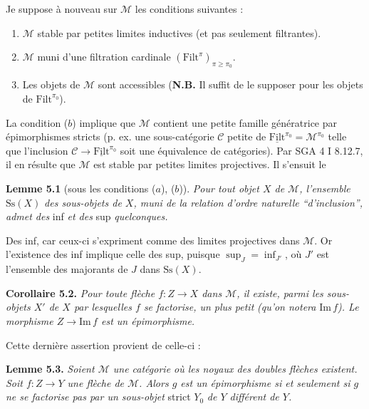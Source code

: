\documentclass[11pt]{article}
\newcommand{\printedpage}[1]{\marginpar{\footnotesize p.~#1}}
\newcommand{\msp}[1]{\marginpar{\footnotesize [#1]}}
\newcommand{\cM}{\mathcal{M}}
\newcommand{\cC}{\mathcal{C}}
\newcommand{\Filt}{\mathrm{Filt}}
\newcommand{\uFilt}{\underline{\mathrm{Filt}}}
\newcommand{\Ss}{\mathrm{Ss}}
\newcommand{\Img}{\mathrm{Im}\,}
\begin{document}
\printedpage{29}

Je suppose à nouveau sur $\cM$ les conditions suivantes :
\msp{page 44}

\begin{enumerate}[nosep]
\item[\textit{a})] $\cM$ stable par petites limites inductives (et pas seulement filtrantes).
\item[\textit{b})] $\cM$ muni d'une filtration cardinale $(\Filt^{\pi})_{\pi\geq\pi_0}$.
\item[\textit{c})] Les objets de $\cM$ sont accessibles (\textbf{N.B.} Il suffit de le supposer pour les objets de $\Filt^{\pi_0}$).
\end{enumerate}

La condition ($b$) implique que $\cM$ contient une petite famille génératrice par épimorphismes stricts (p. ex. une sous-catégorie $\cC$ petite de $\uFilt^{\pi_0} = \cM^{\pi_0}$ telle que l'inclusion $\cC \longrightarrow \uFilt^{\pi_0}$ soit une équivalence de catégories). Par SGA 4 I 8.12.7, il en résulte que $\cM$ est stable par petites limites projectives. Il s'ensuit le

\textbf{Lemme 5.1} (sous les conditions ($a$), ($b$)). \textit{Pour tout objet $X$ de $\cM$, l'ensemble} $\Ss(X)$ \textit{des sous-objets de $X$, muni de la relation d'ordre naturelle ``d'inclusion'', admet des} inf \textit{et des} sup \textit{quelconques.}

Des inf, car ceux-ci s'expriment comme des limites projectives dans $\cM$. Or l'existence des inf implique celle des sup, puisque $\sup_J = \inf_{J'}$, où $J'$ est l'ensemble des majorants de $J$ dans $\Ss(X)$.

\textbf{Corollaire 5.2.} \textit{Pour toute flèche $f : Z \longrightarrow X$ dans $\cM$, il existe, parmi les sous-objets $X'$ de $X$ par lesquelles $f$ se factorise, un plus petit} %
\msp{page 45}
\textit{(qu'on notera} $\Img f$\textit{). Le morphisme $Z \longrightarrow \Img f$ est un épimorphisme.}

Cette dernière assertion provient de celle-ci :

\textbf{Lemme 5.3.} \textit{Soient $\cM$ une catégorie où les noyaux des doubles flèches existent. Soit $f : Z \longrightarrow Y$ une flèche de $\cM$. Alors $g$ est un épimorphisme si et seulement si $g$ ne se factorise pas par un sous-objet} strict $Y_0$ \textit{de $Y$ différent de $Y$.} %
\end{document}
